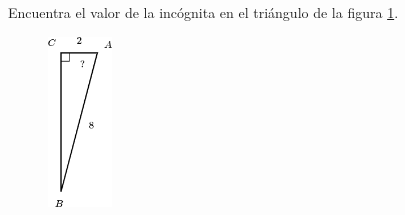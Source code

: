 Encuentra el valor de la incógnita en el triángulo de la figura \ref{fig:angle_functrig_20}.
\begin{figure}[H]
    \begin{center}
        \includegraphics[width=0.15\textwidth]{../images/angle_functrig_20.png}
    \end{center}
    \caption{}
    \label{fig:angle_functrig_20}
\end{figure}